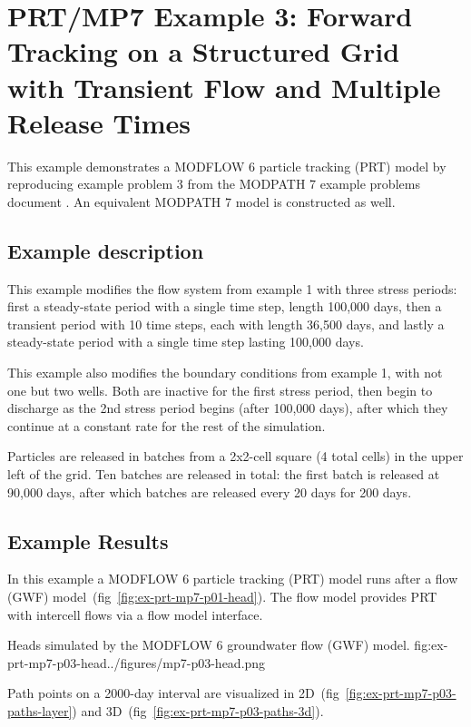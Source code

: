 \section{PRT/MP7 Example 3: Forward Tracking on a Structured Grid with Transient Flow and Multiple Release Times}

This example demonstrates a MODFLOW 6 particle tracking (PRT) model by reproducing example problem 3 from the MODPATH 7 \citep{pollock2016modpath7} example problems document \citep{modpath7examples}. An equivalent MODPATH 7 model is constructed as well.

\subsection{Example description}

This example modifies the flow system from example 1 with three stress periods: first a steady-state period with a single time step, length 100,000 days, then a transient period with 10 time steps, each with length 36,500 days, and lastly a steady-state period with a single time step lasting 100,000 days.

This example also modifies the boundary conditions from example 1, with not one but two wells. Both are inactive for the first stress period, then begin to discharge as the 2nd stress period begins (after 100,000 days), after which they continue at a constant rate for the rest of the simulation.

Particles are released in batches from a 2x2-cell square (4 total cells) in the upper left of the grid. Ten batches are released in total: the first batch is released at 90,000 days, after which batches are released every 20 days for 200 days.

\subsection{Example Results}

In this example a MODFLOW 6 particle tracking (PRT) model runs after a flow (GWF) model~(fig~\ref{fig:ex-prt-mp7-p01-head}). The flow model provides PRT with intercell flows via a flow model interface.

\begin{StandardFigure}{
    Heads simulated by the MODFLOW 6 groundwater flow (GWF) model.
    }{fig:ex-prt-mp7-p03-head}{../figures/mp7-p03-head.png}
\end{StandardFigure}

Path points on a 2000-day interval are visualized in 2D~(fig~\ref{fig:ex-prt-mp7-p03-paths-layer}) and 3D~(fig~\ref{fig:ex-prt-mp7-p03-paths-3d}).


